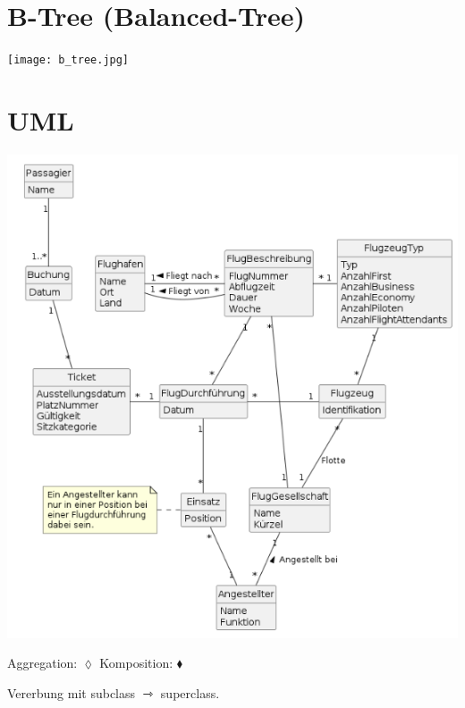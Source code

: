 \begin{multicols*}{3}
\section{B-Tree (Balanced-Tree)}

\texttt{[image: b\_tree.jpg]}

\section{UML}

\includegraphics[height=\columnwidth-3em,angle=90]{uml2.png}

Aggregation: $\lozenge$ Komposition: $\blacklozenge $

Vererbung mit subclass {\huge$\rightarrowtriangle$} superclass.


\end{multicols*}

